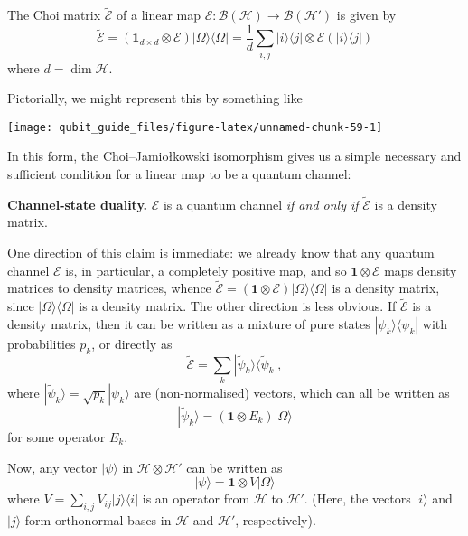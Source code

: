 \documentclass[fleqn]{article}
\newenvironment{idea}{\noindent}{\medskip}
\renewcommand{\footnote}[1]{\en{#1}}
\begin{document}
\begin{idea}

The Choi matrix \(\widetilde{\mathcal{E}}\) of a linear map \(\mathcal{E}\colon\mathcal{B}(\mathcal{H})\to\mathcal{B}(\mathcal{H'})\) is given by
\[
  \widetilde{\mathcal{E}}
  = (\mathbf{1}_{d\times d}\otimes\mathcal{E})|\Omega\rangle\langle\Omega|
  = \frac{1}{d} \sum_{i,j} |i\rangle\langle j|\otimes\mathcal{E}(|i\rangle\langle j|)
\]
where \(d=\dim\mathcal{H}\).

Pictorially, we might represent this by something like

\begin{center}\texttt{[image: qubit\_guide\_files/figure-latex/unnamed-chunk-59-1]} \end{center}

\end{idea}

In this form, the Choi--Jamiołkowski isomorphism gives us a simple necessary and sufficient condition for a linear map to be a quantum channel:

\begin{idea}
\textbf{Channel-state duality.} \(\mathcal{E}\) is a quantum channel \emph{if and only if} \(\widetilde{\mathcal{E}}\) is a density matrix.

\end{idea}

One direction of this claim is immediate: we already know that any quantum channel \(\mathcal{E}\) is, in particular, a completely positive map, and so \(\mathbf{1}\otimes\mathcal{E}\) maps density matrices to density matrices, whence \(\widetilde{\mathcal{E}}=(\mathbf{1}\otimes\mathcal{E})|\Omega\rangle\langle\Omega|\) is a density matrix, since \(|\Omega\rangle\langle\Omega|\) is a density matrix.
The other direction is less obvious.
If \(\widetilde{\mathcal{E}}\) is a density matrix, then it can be written as a mixture of pure states \(|\psi_k\rangle\langle\psi_k|\) with probabilities \(p_k\), or directly as
\[
  \widetilde{\mathcal{E}}
  = \sum_k|\widetilde{\psi}_k\rangle\langle\widetilde{\psi}_k|,
\]
where \(|\widetilde{ \psi}_k\rangle=\sqrt{p_k}|\psi_k\rangle\) are (non-normalised) vectors, which can all be written as
\[
  |\widetilde{ \psi}_k\rangle = (\mathbf{1}\otimes E_k)|\Omega\rangle
\]
for some operator \(E_k\).

Now, any vector \(|\psi\rangle\) in \(\mathcal{H}\otimes\mathcal{H}'\) can be written as\footnote{\textbf{Exercise.} Prove this!}
\[
  |\psi\rangle=\mathbf{1}\otimes V|\Omega\rangle
\]
where \(V=\sum_{i,j}V_{ij}|j\rangle\langle i|\) is an operator from \(\mathcal{H}\) to \(\mathcal{H}'\).
(Here, the vectors \(|i\rangle\) and \(|j\rangle\) form orthonormal bases in \(\mathcal{H}\) and \(\mathcal{H}'\), respectively).
\end{document}

